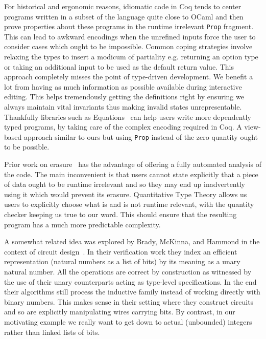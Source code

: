 \documentclass{article}
\newcommand{\coq}{Coq}
\begin{document}
For historical and ergonomic reasons, idiomatic code in \coq{} tends to center programs
written in a subset of the language quite close to OCaml and then prove properties
about these programs in the runtime irrelevant \texttt{Prop} fragment.
%
This can lead to awkward encodings when the unrefined inputs force the user to consider
cases which ought to be impossible. Common coping strategies involve relaxing the types
to insert a modicum of partiality e.g. returning an option type or taking an additional
input to be used as the default return value.
%
This approach completely misses the point of type-driven development. We benefit a lot
from having as much information as possible available during interactive editing. This
helps tremendously getting the definitions right by ensuring we always maintain vital
invariants thus making invalid states unrepresentable.
%
Thankfully libraries such as Equations~\cite{DBLP:conf/itp/Sozeau10,DBLP:journals/pacmpl/SozeauM19}
can help users write more dependently typed programs, by taking care of the complex
encoding required in \coq{}. A view-based approach similar to ours but using \texttt{Prop}
instead of the zero quantity ought to be possible.

Prior work on erasure~\cite{DBLP:journals/pacmpl/Tejiscak20} has the advantage of
offering a fully automated analysis of the code. The main inconvenient is that users
cannot state explicitly that a piece of data ought to be runtime irrelevant and so
they may end up inadvertently using it which would prevent its erasure.
%
Quantitative Type Theory allows us users to explicitly choose what is and is not
runtime relevant, with the quantity checker keeping us true to our word.
%
This should ensure that the resulting program has a much more predictable complexity.

A somewhat related idea was explored by Brady, McKinna, and Hammond in the context of
circuit design~\cite{DBLP:conf/sfp/BradyMH07}. In their verification work they index
an efficient representation (natural numbers as a list of bits) by its meaning as a
unary natural number. All the operations are correct by construction as witnessed by
the use of their unary counterparts acting as type-level specifications.
%
In the end their algorithms still process the inductive family instead of working
directly with binary numbers. This makes sense in their setting where they construct
circuits and so are explicitly manipulating wires carrying bits.
%
By contrast, in our motivating example we really want to get down to actual (unbounded)
integers rather than linked lists of bits.
\end{document}
